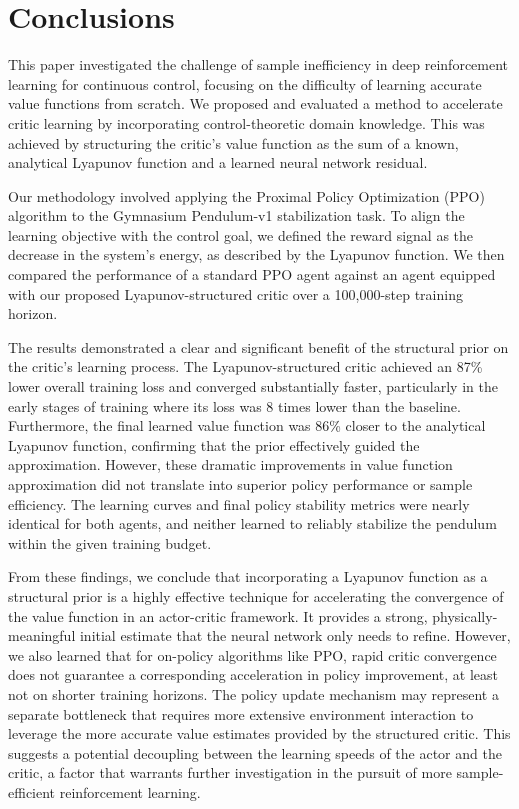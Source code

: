 \documentclass[]{article}
\begin{document}
\section{Conclusions}
\label{sec:conclusions}
This paper investigated the challenge of sample inefficiency in deep reinforcement learning for continuous control, focusing on the difficulty of learning accurate value functions from scratch. We proposed and evaluated a method to accelerate critic learning by incorporating control-theoretic domain knowledge. This was achieved by structuring the critic's value function as the sum of a known, analytical Lyapunov function and a learned neural network residual.

Our methodology involved applying the Proximal Policy Optimization (PPO) algorithm to the Gymnasium Pendulum-v1 stabilization task. To align the learning objective with the control goal, we defined the reward signal as the decrease in the system's energy, as described by the Lyapunov function. We then compared the performance of a standard PPO agent against an agent equipped with our proposed Lyapunov-structured critic over a 100,000-step training horizon.

The results demonstrated a clear and significant benefit of the structural prior on the critic's learning process. The Lyapunov-structured critic achieved an 87\% lower overall training loss and converged substantially faster, particularly in the early stages of training where its loss was 8 times lower than the baseline. Furthermore, the final learned value function was 86\% closer to the analytical Lyapunov function, confirming that the prior effectively guided the approximation. However, these dramatic improvements in value function approximation did not translate into superior policy performance or sample efficiency. The learning curves and final policy stability metrics were nearly identical for both agents, and neither learned to reliably stabilize the pendulum within the given training budget.

From these findings, we conclude that incorporating a Lyapunov function as a structural prior is a highly effective technique for accelerating the convergence of the value function in an actor-critic framework. It provides a strong, physically-meaningful initial estimate that the neural network only needs to refine. However, we also learned that for on-policy algorithms like PPO, rapid critic convergence does not guarantee a corresponding acceleration in policy improvement, at least not on shorter training horizons. The policy update mechanism may represent a separate bottleneck that requires more extensive environment interaction to leverage the more accurate value estimates provided by the structured critic. This suggests a potential decoupling between the learning speeds of the actor and the critic, a factor that warrants further investigation in the pursuit of more sample-efficient reinforcement learning.


{}

\end{document}

